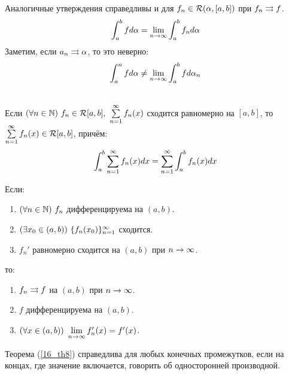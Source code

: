 \begin{note}
	Аналогичные утверждения справедливы и для $f_n\in\mathcal R(\alpha,[a,b])$ при $f_n\rightrightarrows f$.
	\[\int_a^bfd\al=\lim_{n\ra\i}\int_a^bf_nd\al\]
	Заметим, если $a_n\rightrightarrows\alpha$, то это неверно:
	\[\int_a^nfd\al\neq\lim_{n\ra\i}\int_a^bfd\al_n\]
\end{note}
\begin{theorem}\label{16_th7'}\\
	Если $(\fa n\in\N)\ f_n\in\mc R[a,b],\ \ss f_n(x)$ сходится равномерно на $[a,b]$, то $\ss f_n(x)\in\mc R[a,b]$, причём:
	\[\int_a^b\ss f_n(x)dx=\ss\int_a^bf_n(x)dx\]
\end{theorem}
\begin{theorem}\label{16_th8}
	Если:
	\begin{enumerate}
		\item $(\forall n\in\mathbb{N})\ f_n$ дифференцируема на $(a,b)$.
		\item $(\ex x_0\in(a,b))\ \sq[f_n(x_0)]$ сходится.
		\item $f_n'$ равномерно сходится на $(a,b)$ при $n\rightarrow\infty$.
	\end{enumerate}
	то:
	\begin{enumerate}
		\item $f_n\rightrightarrows f$ на $(a,b)$ при $n\rightarrow\infty$.
		\item $f$ дифференцируема на $(a,b)$.
		\item $(\fa x\in(a,b))\ \lim_{n\ra\i}f_n'(x)=f'(x)$.
	\end{enumerate}
\end{theorem}
\begin{note}
	Теорема (\ref{16_th8}) справедлива для любых конечных промежутков, если на концах, где значение включается, говорить об односторонней производной.
\end{note}
